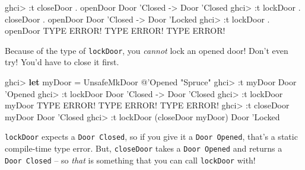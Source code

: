 \documentclass[]{article}
\newenvironment{Shaded}{}{}
\newcommand{\KeywordTok}[1]{\textcolor[rgb]{0.00,0.44,0.13}{\textbf{#1}}}
\newcommand{\DataTypeTok}[1]{\textcolor[rgb]{0.56,0.13,0.00}{#1}}
\newcommand{\CharTok}[1]{\textcolor[rgb]{0.25,0.44,0.63}{#1}}
\newcommand{\FunctionTok}[1]{\textcolor[rgb]{0.02,0.16,0.49}{#1}}
\newcommand{\NormalTok}[1]{#1}
\begin{document}
\begin{Shaded}
\begin{Highlighting}[]
\NormalTok{ghci}\FunctionTok{>} \FunctionTok{:}\NormalTok{t closeDoor }\FunctionTok{.}\NormalTok{ openDoor}
\DataTypeTok{Door} \CharTok{'Closed -> Door '}\DataTypeTok{Closed}
\NormalTok{ghci}\FunctionTok{>} \FunctionTok{:}\NormalTok{t lockDoor }\FunctionTok{.}\NormalTok{ closeDoor }\FunctionTok{.}\NormalTok{ openDoor}
\DataTypeTok{Door} \CharTok{'Closed -> Door '}\DataTypeTok{Locked}
\NormalTok{ghci}\FunctionTok{>} \FunctionTok{:}\NormalTok{t lockDoor }\FunctionTok{.}\NormalTok{ openDoor}
\DataTypeTok{TYPE} \DataTypeTok{ERROR}\FunctionTok{!}  \DataTypeTok{TYPE} \DataTypeTok{ERROR}\FunctionTok{!}  \DataTypeTok{TYPE} \DataTypeTok{ERROR}\FunctionTok{!}
\end{Highlighting}
\end{Shaded}

Because of the type of \texttt{lockDoor}, you \emph{cannot} lock an opened door!
Don't even try! You'd have to close it first.

\begin{Shaded}
\begin{Highlighting}[]
\NormalTok{ghci}\FunctionTok{>} \KeywordTok{let}\NormalTok{ myDoor }\FunctionTok{=} \DataTypeTok{UnsafeMkDoor} \FunctionTok{@}\CharTok{'Opened "Spruce"}
\NormalTok{ghci}\FunctionTok{>} \FunctionTok{:}\NormalTok{t myDoor}
\DataTypeTok{Door} \CharTok{'Opened}
\NormalTok{ghci}\FunctionTok{>} \FunctionTok{:}\NormalTok{t lockDoor}
\DataTypeTok{Door} \CharTok{'Closed -> Door '}\DataTypeTok{Closed}
\NormalTok{ghci}\FunctionTok{>} \FunctionTok{:}\NormalTok{t lockDoor myDoor}
\DataTypeTok{TYPE} \DataTypeTok{ERROR}\FunctionTok{!}  \DataTypeTok{TYPE} \DataTypeTok{ERROR}\FunctionTok{!}  \DataTypeTok{TYPE} \DataTypeTok{ERROR}\FunctionTok{!}
\NormalTok{ghci}\FunctionTok{>} \FunctionTok{:}\NormalTok{t closeDoor myDoor}
\DataTypeTok{Door} \CharTok{'Closed}
\NormalTok{ghci}\FunctionTok{>} \FunctionTok{:}\NormalTok{t lockDoor (closeDoor myDoor)}
\DataTypeTok{Door} \CharTok{'Locked}
\end{Highlighting}
\end{Shaded}

\texttt{lockDoor} expects a \texttt{Door\ \textquotesingle{}Closed}, so if you
give it a \texttt{Door\ \textquotesingle{}Opened}, that's a static compile-time
type error. But, \texttt{closeDoor} takes a
\texttt{Door\ \textquotesingle{}Opened} and returns a
\texttt{Door\ \textquotesingle{}Closed} -- so \emph{that} is something that you
can call \texttt{lockDoor} with!
\end{document}
